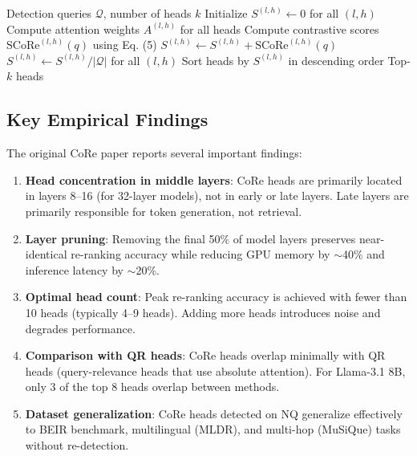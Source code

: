 \documentclass[11pt,a4paper]{article}
\begin{document}
\begin{algorithm}
\caption{CoRe Head Selection (Current Method)}
\begin{algorithmic}[1]
\Require Detection queries $\mathcal{Q}$, number of heads $k$
\State Initialize $S^{(l,h)} \gets 0$ for all $(l,h)$
    \State Compute attention weights $A^{(l,h)}$ for all heads
    \State Compute contrastive scores $\text{SCoRe}^{(l,h)}(q)$ using Eq. (5)
    \State $S^{(l,h)} \gets S^{(l,h)} + \text{SCoRe}^{(l,h)}(q)$
\EndFor
\State $S^{(l,h)} \gets S^{(l,h)} / |\mathcal{Q}|$ for all $(l,h)$
\State Sort heads by $S^{(l,h)}$ in descending order
\State \Return Top-$k$ heads
\end{algorithmic}
\end{algorithm}

\subsection{Key Empirical Findings}

The original CoRe paper \cite{core} reports several important findings:

\begin{enumerate}
    \item \textbf{Head concentration in middle layers}: CoRe heads are primarily located in layers 8--16 (for 32-layer models), not in early or late layers. Late layers are primarily responsible for token generation, not retrieval.

    \item \textbf{Layer pruning}: Removing the final 50\% of model layers preserves near-identical re-ranking accuracy while reducing GPU memory by $\sim$40\% and inference latency by $\sim$20\%.

    \item \textbf{Optimal head count}: Peak re-ranking accuracy is achieved with fewer than 10 heads (typically 4--9 heads). Adding more heads introduces noise and degrades performance.

    \item \textbf{Comparison with QR heads}: CoRe heads overlap minimally with QR heads (query-relevance heads that use absolute attention). For Llama-3.1 8B, only 3 of the top 8 heads overlap between methods.

    \item \textbf{Dataset generalization}: CoRe heads detected on NQ generalize effectively to BEIR benchmark, multilingual (MLDR), and multi-hop (MuSiQue) tasks without re-detection.
\end{enumerate}
\end{document}
